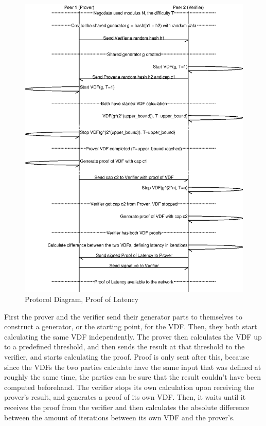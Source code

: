 \begin{figure}
  \includegraphics[width=\textwidth]{pictures/pol2_diagram.eps}
  \caption{Protocol Diagram, Proof of Latency}
  \label{PoL Diagram 2}
\end{figure}

First the prover and the verifier send their generator parts to themselves to construct a generator, or the starting point, for the VDF. Then, they both start calculating the same VDF independently. The prover then calculates the VDF up to a predefined threshold, and then sends the result at that threshold to the verifier, and starts calculating the proof. Proof is only sent after this, because since the VDFs the two parties calculate have the same input that was defined at roughly the same time, the parties can be sure that the result couldn't have been computed beforehand. The verifier stops its own calculation upon receiving the prover's result, and generates a proof of its own VDF. Then, it waits until it receives the proof from the verifier and then calculates the absolute difference between the amount of iterations between its own VDF and the prover's.

